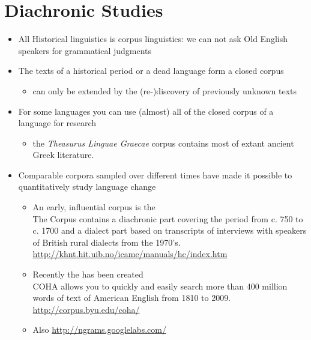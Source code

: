 \documentclass[a4paper,landscape,headrule,footrule,xetex]{foils}
\begin{document}
\section{Diachronic Studies}
\MyLogo{}

\begin{itemize}
\item All Historical linguistics is corpus linguistics: we can not ask
  Old English speakers for grammatical judgments
\item The texts of a historical period or a dead language form a closed corpus 
  \begin{itemize}  \item  can only be extended by the (re-)discovery of previously unknown texts
  \end{itemize}
\item For some languages you can  use (almost) all of the closed corpus of a language for research 
  \begin{itemize}
  \item  the \textit{Theasurus Linguae Graecae} corpus contains most of extant ancient Greek literature.
  \end{itemize}
\end{itemize}


\begin{itemize}
\item Comparable corpora sampled over different times have made it
  possible to quantitatively study language change %
\begin{itemize}
\item An early, influential corpus is the 
  \\The Corpus contains a diachronic part covering the period from c. 750 to c. 1700 and a dialect part based on transcripts of interviews with speakers of British rural dialects from the 1970's.
  \\ \url{http://khnt.hit.uib.no/icame/manuals/hc/index.htm} 
\item Recently the  has been created
\\ COHA allows you to quickly and easily search more than 400 million words of text of American English from 1810 to 2009. 
\\ \url{http://corpus.byu.edu/coha/}
\item Also \url{http://ngrams.googlelabs.com/}
\end{itemize}
\end{itemize}
\end{document}
